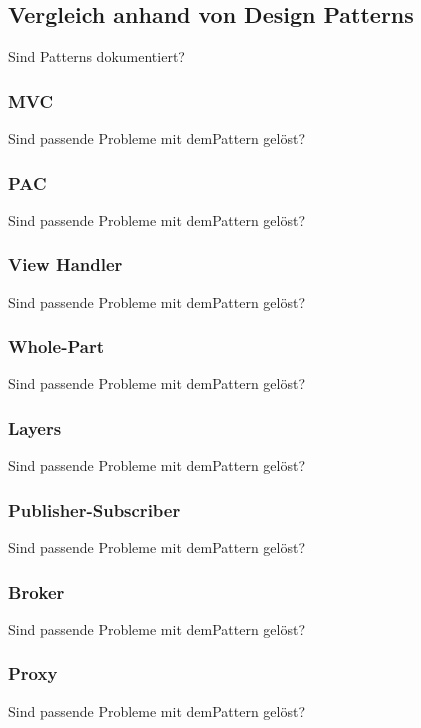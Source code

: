 \color{red}

\subsection{Vergleich anhand von Design Patterns}
Sind Patterns dokumentiert?

\subsubsection{MVC}
Sind passende Probleme mit demPattern gelöst?

\subsubsection{PAC}
Sind passende Probleme mit demPattern gelöst?

\subsubsection{View Handler}
Sind passende Probleme mit demPattern gelöst?

\subsubsection{Whole-Part}
Sind passende Probleme mit demPattern gelöst?

\subsubsection{Layers}
Sind passende Probleme mit demPattern gelöst?

\subsubsection{Publisher-Subscriber}
Sind passende Probleme mit demPattern gelöst?

\subsubsection{Broker}
Sind passende Probleme mit demPattern gelöst?

\subsubsection{Proxy}
Sind passende Probleme mit demPattern gelöst?

